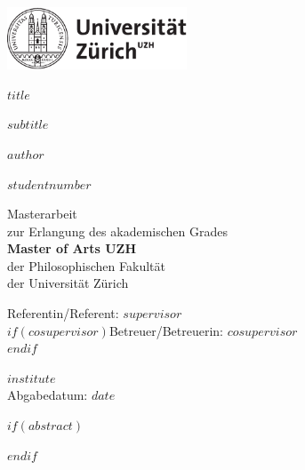 \documentclass[$if(fontsize)$$fontsize$,$endif$$if(lang)$$lang$,$endif$$if(papersize)$$papersize$,$endif$$for(classoption)$$classoption$$sep$,$endfor$]{$documentclass$}
\begin{document}

\begin{titlepage}
    \begin{center}

      \includegraphics[width=0.4\textwidth]{template/uzh_logo_d_pos.pdf}

        \vspace*{2.5cm}

        \huge
        {$title$}

        \vspace{0.5cm}

        \large
        {$subtitle$}

        \vspace{1.5cm}

        \Large
        {$author$}

        \normalsize
        {$studentnumber$}

        \vspace{1.5cm}

        \normalsize
        Masterarbeit\\
        zur Erlangung des akademischen Grades\\
        \textbf{Master of Arts UZH}\\
        der Philosophischen Fakultät\\
        der Universität Zürich

        \vfill

        \normalsize
        Referentin/Referent: {$supervisor$}\\
        $if(cosupervisor)$Betreuer/Betreuerin: {$cosupervisor$}\\$endif$

        \vspace{0.8cm}

        \normalsize
        {$institute$}\\
        Abgabedatum: {$date$}

    \end{center}
\end{titlepage}

$if(abstract)$
\clearpage\mbox{}\thispagestyle{empty}\clearpage
\renewcommand{\abstractname}{Abstract}
\begin{abstract}
$abstract$
\end{abstract}
$endif$
\end{document}
